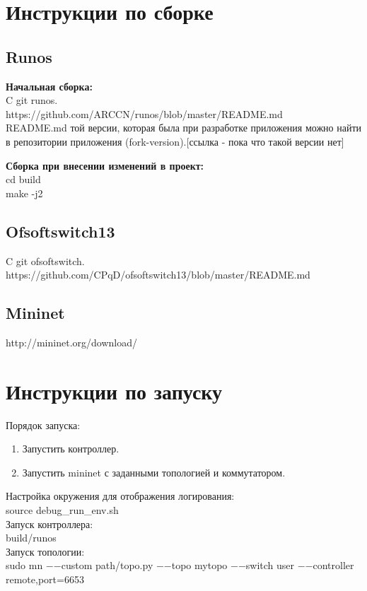 \documentclass[12pt]{article}
\begin{document}
	\section{Инструкции по сборке}
	\subsection{Runos}
	\textbf{Начальная сборка:} \\
	C git runos. \\
	\indent
	https://github.com/ARCCN/runos/blob/master/README.md \\
	README.md той версии, которая была при разработке приложения можно найти в репозитории приложения (fork-version).[ссылка - пока что такой версии нет]
	
	\noindent
	\textbf{Сборка при внесении изменений в проект:} \\
	\indent
	cd build \\
	\indent
	make -j2
	
	\subsection{Ofsoftswitch13}
	C git ofsoftswitch. \\
	\indent
	https://github.com/CPqD/ofsoftswitch13/blob/master/README.md
	
	\subsection{Mininet}
	\indent
	http://mininet.org/download/
	
	\section{Инструкции по запуску}
	
	Порядок запуска:
	\begin{enumerate}
		\item Запустить контроллер.
		\item Запустить mininet с заданными топологией и коммутатором.
	\end{enumerate}

	\noindent
	Настройка окружения для отображения логирования: \\
	\indent
	source debug\_run\_env.sh \\
	Запуск контроллера: \\
	\indent
	build/runos \\
	Запуск топологии: \\
	\indent
	sudo mn $-$$-$custom path/topo.py $-$$-$topo mytopo $-$$-$switch user $-$$-$controller remote,port=6653
	
	
	
	
	
	
	
 
	
\end{document}
